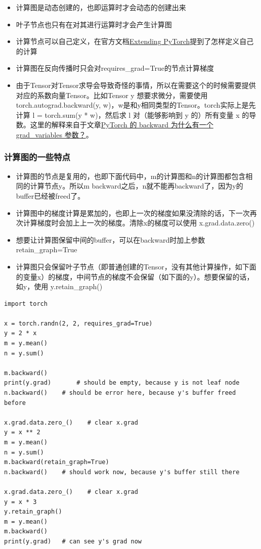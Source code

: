 \begin{itemize}
  \begin{itemize}
  \tightlist
  \item
    计算图是动态创建的，也即运算时才会动态的创建出来
  \item
    叶子节点也只有在对其进行运算时才会产生计算图
  \item
    计算节点可以自己定义，在官方文档\href{https://pytorch.org/docs/stable/notes/extending.html}{Extending
    PyTorch}提到了怎样定义自己的计算
  \item
    计算图在反向传播时只会对requires\_grad=True的节点计算梯度
  \item
    由于Tensor对Tensor求导会导致奇怪的事情，所以在需要这个的时候需要提供对应的系数向量Tensor。比如Tensor
    y 想要求微分，需要使用 torch.autograd.backward(y,
    w)，w是和y相同类型的Tensor。torch实际上是先计算 l = torch.sum(y *
    w)，然后求 l 对（能够影响到 y 的）所有变量 x
    的导数。这里的解释来自于文章\href{https://zhuanlan.zhihu.com/p/29923090}{PyTorch
    的 backward 为什么有一个 grad\_variables 参数？}。
  \end{itemize}
\end{itemize}

\subsubsection{计算图的一些特点}

\begin{itemize}
\tightlist
\item
  计算图的节点是复用的，也即下面代码中，m的计算图和n的计算图都包含相同的计算节点y。所以m
  backward之后，n就不能再backward了，因为y的buffer已经被freed了。
\item
  计算图中的梯度计算是累加的，也即上一次的梯度如果没清除的话，下一次再次计算梯度时会加上上一次的梯度。清除x的梯度可以使用
  x.grad.data.zero()
\item
  想要让计算图保留中间的buffer，可以在backward时加上参数retain\_graph=True
\item
  计算图只会保留叶子节点（即普通创建的Tensor，没有其他计算操作，如下面的变量x）的梯度，中间节点的梯度不会保留（如下面的y）。想要保留的话，如y，使用
  y.retain\_graph()
\end{itemize}

\begin{lstlisting}
import torch

x = torch.randn(2, 2, requires_grad=True)
y = 2 * x
m = y.mean()
n = y.sum()

m.backward()
print(y.grad)       # should be empty, because y is not leaf node
n.backward()    # should be error here, because y's buffer freed before

x.grad.data.zero_()    # clear x.grad
y = x ** 2
m = y.mean()
n = y.sum()
m.backward(retain_graph=True)
n.backward()    # should work now, because y's buffer still there

x.grad.data.zero_()    # clear x.grad
y = x * 3
y.retain_graph()
m = y.mean()
m.backward()
print(y.grad)	# can see y's grad now
\end{lstlisting}


